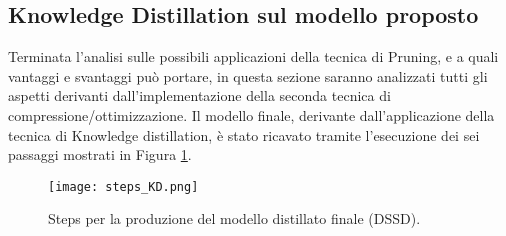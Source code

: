 \subsection{Knowledge Distillation sul modello proposto}\label{KD_steps}
Terminata l'analisi sulle possibili applicazioni della tecnica di Pruning, e a 
quali vantaggi e svantaggi può portare, in questa sezione saranno analizzati 
tutti gli aspetti derivanti dall'implementazione della seconda tecnica di 
compressione/ottimizzazione. Il modello finale, derivante dall'applicazione 
della tecnica di Knowledge distillation, è stato ricavato tramite l'esecuzione 
dei sei passaggi mostrati in Figura \ref{steps_KD}.
\begin{figure}
    \centering
    \texttt{[image: steps\_KD.png]}
    \centering
    \caption{Steps per la produzione del modello distillato finale (DSSD).}
    \label{steps_KD}
\end{figure}

